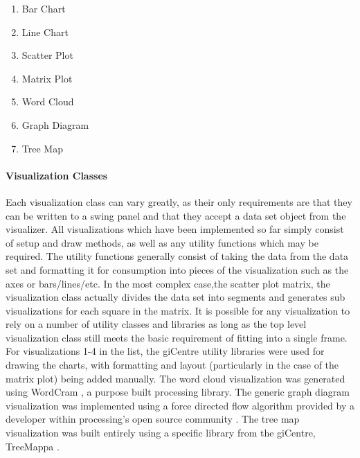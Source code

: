 	\begin{enumerate}
		\item{Bar Chart}
		\item{Line Chart}
		\item{Scatter Plot}
		\item{Matrix Plot}
		\item{Word Cloud}
		\item{Graph Diagram}
		\item{Tree Map}
	\end{enumerate}


\paragraph{Visualization Classes}
Each visualization class can vary greatly, as their only requirements are that they can be written to a swing panel and that they accept a data set object from the visualizer. All visualizations which have been implemented so far simply consist of setup and draw methods, as well as any utility functions which may be required. The utility functions generally consist of taking the data from the data set and formatting it for consumption into pieces of the visualization such as the axes or bars/lines/etc. In the most complex case,the scatter plot matrix, the visualization class actually divides the data set into segments and generates sub visualizations for each square in the matrix. It is possible for any visualization to rely on a number of utility classes and libraries as long as the top level visualization class still meets the basic requirement of fitting into a single frame. For visualizations 1-4 in the list, the giCentre utility libraries \cite{CityUniversityLondon2013} were used for drawing the charts, with formatting and layout (particularly in the case of the matrix plot) being added manually. The word cloud visualization was generated using WordCram \cite{Bernier2015}, a purpose built processing library. The generic graph diagram visualization was implemented using a force directed flow algorithm provided by a developer within processing's open source community \cite{Kamermans2011}. The tree map visualization was built entirely using a specific library from the giCentre, TreeMappa \cite{CityUniversityLondon2010}.

